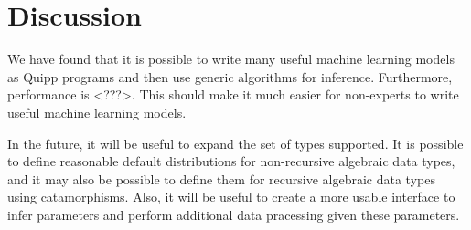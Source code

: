 \documentclass{article}
\begin{document}
  \section{Discussion}

  We have found that it is possible to write many useful machine learning models as Quipp programs and then use generic algorithms for inference.  Furthermore, performance is <???>.  This should make it much easier for non-experts to write useful machine learning models.
  
  In the future, it will be useful to expand the set of types supported.  It is possible to define reasonable default distributions for non-recursive algebraic data types, and it may also be possible to define them for recursive algebraic data types using catamorphisms.  Also, it will be useful to create a more usable interface to infer parameters and perform additional data pracessing given these parameters.
\end{document}
